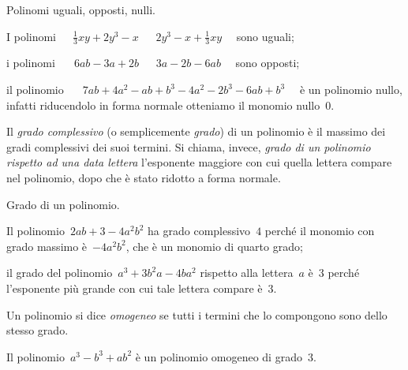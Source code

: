 \begin{esempio}
Polinomi uguali, opposti, nulli.
\begin{enumeratea}
\item I polinomi~\(\quad \frac{1}{3}xy+2y^3-x\) \(\quad~2y^3-x+\frac{1}{3}xy 
\quad\) sono uguali;
\item i polinomi~\(\quad~6ab-3a+2b\) \(\quad~3a-2b-6ab \quad\) sono opposti;
\item il polinomio~\(\quad~7ab+4a^2-ab+b^3-4a^2-2b^3-6ab+b^3 \quad\) è un 
polinomio nullo, infatti riducendolo in forma normale otteniamo il monomio 
nullo~\(0\).
\end{enumeratea}
\end{esempio}

\begin{definizione}
Il \emph{grado complessivo} (o semplicemente \emph{grado}) di un polinomio 
è il massimo dei gradi complessivi dei suoi
termini. Si chiama, invece, \emph{grado di un polinomio rispetto ad una 
data lettera} l'esponente maggiore con
cui quella lettera compare nel polinomio, dopo che è stato ridotto a forma 
normale.
\end{definizione}

\begin{esempio} Grado di un polinomio.
\begin{itemize*}
\item Il polinomio~\(2ab+3-4a^2b^2\) ha grado complessivo~\(4\) perché il 
monomio con grado massimo è~\(-4a^2b^2 \), che è un monomio di quarto grado;
\item il grado del polinomio~\(a^3+3b^2a-4ba^2\) rispetto alla lettera~\(a\) 
è~\(3\) perché l'esponente più grande con cui tale lettera compare è~\(3\).
\end{itemize*}
\end{esempio}


\begin{definizione}
Un polinomio si dice \emph{omogeneo} se tutti i termini che lo compongono 
sono dello stesso grado.
\end{definizione}

\begin{esempio}
Il polinomio~\(a^3-b^3+ab^2\) è un polinomio omogeneo di grado~\(3\).
\end{esempio}

